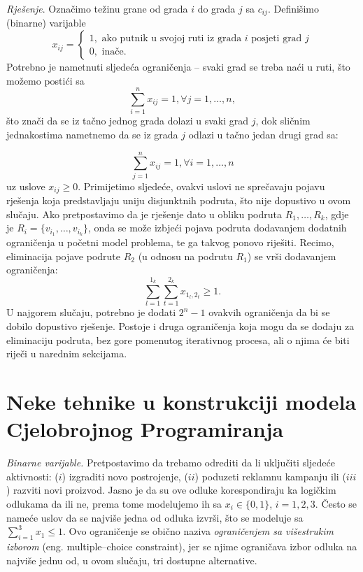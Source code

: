 \documentclass[a4paper, utf8, 11pt, colorlinks]{book}
\begin{document}
\emph{Rješenje}. Označimo težinu grane od grada $i$ do grada $j$ sa $c_{ij}$.  Definišimo (binarne) varijable 
$$x_{ij} = \begin{cases}
                1, \mbox{ ako putnik u svojoj ruti iz grada } i \mbox{ posjeti grad } j \\
                0, \mbox{ inače}. 
          \end{cases}$$ 
Potrebno je nametnuti sljedeća ograničenja -- svaki grad se treba naći u ruti,  što možemo postići sa 
$$  \sum_{i=1}^n x_{ij} = 1, \forall j =1,\ldots, n,$$ 
što znači da se iz tačno jednog grada dolazi u svaki grad $j$, dok sličnim jednakostima nametnemo da se iz grada $j$ odlazi u tačno jedan drugi grad sa:

$$  \sum_{j=1}^n x_{ij} = 1, \forall i =1,\ldots, n$$ 
 uz uslove $x_{ij}\geq 0$. Primijetimo sljedeće, ovakvi uslovi ne sprečavaju pojavu rješenja koja predstavljaju uniju disjunktnih podruta, što nije dopustivo u ovom slučaju. Ako pretpostavimo da je rješenje dato u obliku podruta $R_1, \ldots, R_k$, gdje je $R_i = \{ v_{i_1}, \ldots, v_{i_k} \}$, onda se može izbjeći pojava podruta dodavanjem dodatnih ograničenja u početni model problema, te ga takvog ponovo riješiti. Recimo, eliminacija pojave podrute $R_2$ (u odnosu na podrutu $R_1$) se vrši dodavanjem ograničenja:
 $$ \sum_{l=1}^{1_k}\sum_{t=1}^{2_k} x_{1_l, 2_t} \geq 1.$$
 U najgorem slučaju, potrebno je dodati $2^n-1$ ovakvih ograničenja da bi se dobilo dopustivo rješenje. Postoje i druga ograničenja koja mogu da se dodaju za eliminaciju podruta, bez gore pomenutog iterativnog procesa, ali o njima će biti riječi u narednim sekcijama. 
 
 \section{Neke tehnike u konstrukciji modela Cjelobrojnog Programiranja}
 
 \emph{Binarne varijable.} Pretpostavimo da trebamo odrediti da li uključiti sljedeće aktivnosti: ($i$) izgraditi novo postrojenje,
($ii$) poduzeti reklamnu kampanju ili ($iii$) razviti novi proizvod. Jasno je da su ove odluke korespondiraju ka logičkim odlukama da ili ne, prema tome modelujemo ih sa  $x_i \in \{0, 1 \}$, $i=1,2,3$. Često se nameće uslov da se najviše jedna od odluka izvrši, što se modeluje sa $\sum_{i=1}^3 x_1 \leq 1$. Ovo ograničenje se obično naziva \emph{ograničenjem sa višestrukim izborom} (eng. multiple--choice constraint), jer se njime ograničava izbor odluka na najviše jednu od, u ovom slučaju, tri dostupne alternative. 
\end{document}
